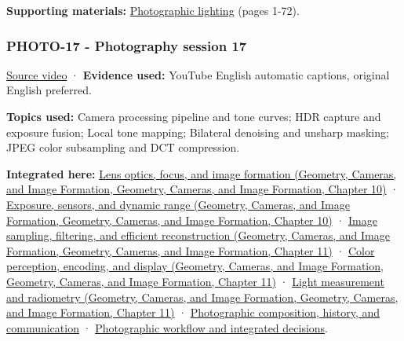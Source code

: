 \textbf{Supporting materials:} \href{https://drive.google.com/open?id=0B6w2XfPHEcZYN1dYTWZndkZDNVE}{Photographic lighting} (pages 1-72).

\subsubsection{PHOTO-17 - Photography session 17}\label{04-visual-computing-ii-ch036-photo-17---photography-session-17}

\href{https://www.youtube.com/watch?v=Jb4ojXL3xcA}{Source video} · \textbf{Evidence used:} YouTube English automatic captions, original English preferred.

\textbf{Topics used:} Camera processing pipeline and tone curves; HDR capture and exposure fusion; Local tone mapping; Bilateral denoising and unsharp masking; JPEG color subsampling and DCT compression.

\textbf{Integrated here:} \href{../03-Geometry-Cameras-and-Image-Formation/main.pdf\#nameddest=03-visual-computing-i-ch003-lens-optics-focus-and-image-formation}{Lens optics, focus, and image formation (Geometry, Cameras, and Image Formation, Geometry, Cameras, and Image Formation, Chapter 10)} · \href{../03-Geometry-Cameras-and-Image-Formation/main.pdf\#nameddest=03-visual-computing-i-ch003-exposure-sensors-and-dynamic-range}{Exposure, sensors, and dynamic range (Geometry, Cameras, and Image Formation, Geometry, Cameras, and Image Formation, Chapter 10)} · \href{../03-Geometry-Cameras-and-Image-Formation/main.pdf\#nameddest=03-visual-computing-i-ch004-image-sampling-filtering-and-efficient-reconstruction}{Image sampling, filtering, and efficient reconstruction (Geometry, Cameras, and Image Formation, Geometry, Cameras, and Image Formation, Chapter 11)} · \href{../03-Geometry-Cameras-and-Image-Formation/main.pdf\#nameddest=03-visual-computing-i-ch004-color-perception-encoding-and-display}{Color perception, encoding, and display (Geometry, Cameras, and Image Formation, Geometry, Cameras, and Image Formation, Chapter 11)} · \href{../03-Geometry-Cameras-and-Image-Formation/main.pdf\#nameddest=03-visual-computing-i-ch004-light-measurement-and-radiometry}{Light measurement and radiometry (Geometry, Cameras, and Image Formation, Geometry, Cameras, and Image Formation, Chapter 11)} · \hyperref[04-visual-computing-ii-ch034-photographic-composition-history-and-communication]{Photographic composition, history, and communication} · \hyperref[04-visual-computing-ii-ch034-photographic-workflow-and-integrated-decisions]{Photographic workflow and integrated decisions}.

